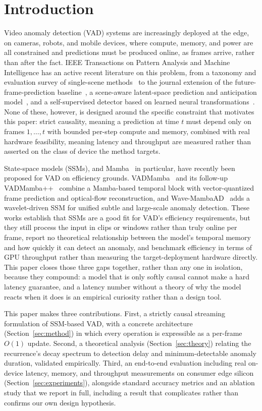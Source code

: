 \section{Introduction}
\label{sec:intro}

Video anomaly detection (VAD) systems are increasingly deployed at the edge, on cameras, robots, and mobile devices, where compute, memory, and power are all constrained and predictions must be produced online, as frames arrive, rather than after the fact. IEEE Transactions on Pattern Analysis and Machine Intelligence has an active recent literature on this problem, from a taxonomy and evaluation survey of single-scene methods~\cite{jones2022survey} to the journal extension of the future-frame-prediction baseline~\cite{luo2022futureframe}, a scene-aware latent-space prediction and anticipation model~\cite{cao2025scenedependent}, and a self-supervised detector based on learned neural transformations~\cite{qiu2025neutral}. None of these, however, is designed around the specific constraint that motivates this paper: strict causality, meaning a prediction at time $t$ must depend only on frames $1,\dots,t$ with bounded per-step compute and memory, combined with real hardware feasibility, meaning latency and throughput are measured rather than asserted on the class of device the method targets.

State-space models (SSMs), and Mamba~\cite{gu2023mamba} in particular, have recently been proposed for VAD on efficiency grounds. VADMamba~\cite{vadmamba2025} and its follow-up VADMamba++~\cite{vadmambaplusplus2026} combine a Mamba-based temporal block with vector-quantized frame prediction and optical-flow reconstruction, and Wave-MambaAD~\cite{wavemambaad2025} adds a wavelet-driven SSM for unified subtle and large-scale anomaly detection. These works establish that SSMs are a good fit for VAD's efficiency requirements, but they still process the input in clips or windows rather than truly online per frame, report no theoretical relationship between the model's temporal memory and how quickly it can detect an anomaly, and benchmark efficiency in terms of GPU throughput rather than measuring the target-deployment hardware directly. This paper closes those three gaps together, rather than any one in isolation, because they compound: a model that is only softly causal cannot make a hard latency guarantee, and a latency number without a theory of why the model reacts when it does is an empirical curiosity rather than a design tool.

This paper makes three contributions. First, a strictly causal streaming formulation of SSM-based VAD, with a concrete architecture (Section~\ref{sec:method}) in which every operation is expressible as a per-frame $O(1)$ update. Second, a theoretical analysis (Section~\ref{sec:theory}) relating the recurrence's decay spectrum to detection delay and minimum-detectable anomaly duration, validated empirically. Third, an end-to-end evaluation including real on-device latency, memory, and throughput measurements on consumer edge silicon (Section~\ref{sec:experiments}), alongside standard accuracy metrics and an ablation study that we report in full, including a result that complicates rather than confirms our own design hypothesis.

